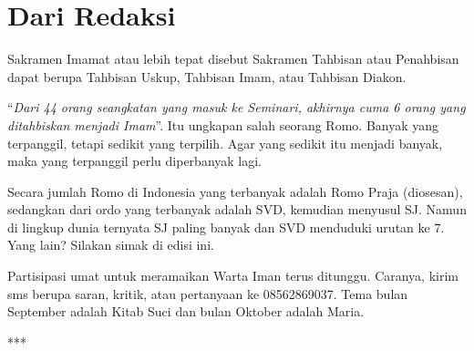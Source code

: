 \newpage

\chapter*{Dari Redaksi}

Sakramen Imamat atau lebih tepat disebut Sakramen Tahbisan atau Penahbisan dapat berupa Tahbisan Uskup, Tahbisan Imam, atau Tahbisan Diakon.

\bigskip
“\textit{Dari 44 orang seangkatan yang masuk ke Seminari, akhirnya cuma
6 orang yang ditahbiskan menjadi Imam}”. Itu ungkapan salah seorang Romo. Banyak yang terpanggil, tetapi sedikit yang terpilih. Agar yang sedikit itu menjadi banyak, maka yang terpanggil perlu diperbanyak lagi. 

\bigskip
Secara jumlah Romo di Indonesia yang terbanyak adalah Romo Praja (diosesan), sedangkan dari ordo yang terbanyak adalah SVD, kemudian menyusul SJ. Namun di lingkup dunia ternyata SJ paling banyak dan SVD menduduki urutan ke 7. Yang lain? Silakan simak di edisi ini.

\bigskip
Partisipasi umat untuk meramaikan Warta Iman terus ditunggu. Caranya, kirim sms berupa saran, kritik, atau pertanyaan ke 08562869037. Tema bulan September adalah Kitab Suci dan bulan Oktober adalah Maria. 
\normalsize

\begin{center}***\end{center} 

\vfill

\footnotesize
{}
\normalsize


